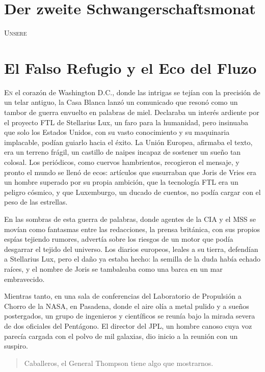 \chapter*{Der zweite Schwangerschaftsmonat}

\lettrine[lines=2, loversize=0.3, lraise=0]{\initfamily U}{nsere}

\chapter{El Falso Refugio y el Eco del Fluzo}

\lettrine[lines=2, loversize=0.3, lraise=0]{E}{n} el corazón de Washington D.C., donde las intrigas se tejían con la precisión de un telar antiguo, la Casa Blanca lanzó un comunicado que resonó como un tambor de guerra envuelto en palabras de miel. Declaraba un interés ardiente por el proyecto FTL de Stellarius Lux, un faro para la humanidad, pero insinuaba que solo los Estados Unidos, con su vasto conocimiento y su maquinaria implacable, podían guiarlo hacia el éxito. La Unión Europea, afirmaba el texto, era un terreno frágil, un castillo de naipes incapaz de sostener un sueño tan colosal. Los periódicos, como cuervos hambrientos, recogieron el mensaje, y pronto el mundo se llenó de ecos: artículos que susurraban que Joris de Vries era un hombre superado por su propia ambición, que la tecnología FTL era un peligro cósmico, y que Luxemburgo, un ducado de cuentos, no podía cargar con el peso de las estrellas.

En las sombras de esta guerra de palabras, donde agentes de la CIA y el MSS se movían como fantasmas entre las redacciones, la prensa británica, con sus propios espías tejiendo rumores, advertía sobre los riesgos de un motor que podía desgarrar el tejido del universo. Los diarios europeos, leales a su tierra, defendían a Stellarius Lux, pero el daño ya estaba hecho: la semilla de la duda había echado raíces, y el nombre de Joris se tambaleaba como una barca en un mar embravecido.

Mientras tanto, en una sala de conferencias del Laboratorio de Propulsión a Chorro de la NASA, en Pasadena, donde el aire olía a metal pulido y a sueños postergados, un grupo de ingenieros y científicos se reunía bajo la mirada severa de dos oficiales del Pentágono. El director del JPL, un hombre canoso cuya voz parecía cargada con el polvo de mil galaxias, dio inicio a la reunión con un suspiro.

\begin{quote}
\calli
\glqq Caballeros, el General Thompson tiene algo que mostrarnos.\grqq
\end{quote}

